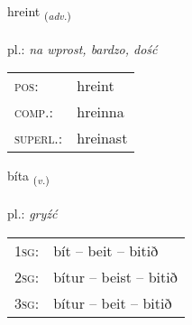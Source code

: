 \documentclass[frontgrid, backgrid]{flacards}\usepackage[]{graphicx}\usepackage[]{xcolor}
\begin{document}
\renewcommand{\flhead}{\vskip5pt \fboxsep=0pt {\small\bfseries\footnotesize Atviksorð | przysłówek}}
\renewcommand{\fcfoot}{\vskip5pt \fboxsep=0pt \hspace{2pt}{\small\bfseries\footnotesize 3K}}

\renewcommand{\blhead}{\vskip5pt {\small\bfseries\footnotesize Atviksorð | przysłówek }}
\renewcommand{\bcfoot}{\vskip5pt \hspace{2pt}{\small\bfseries\footnotesize 3K}}


{hreint \small{\textsubscript{(\textit{adv.})}} \\[1ex] %
\textphonetic{[r̥ein̥t]} \\
pl.: \emph{na wprost, bardzo, dość} \\  [2ex]
\renewcommand*{\arraystretch}{0.8}
\begin{tabular}{ll}
\textsc{pos}: & hreint \\ 
\textsc{comp.}: & hreinna \\ 
\textsc{superl.}: & hreinast \\
\end{tabular}
}

\renewcommand{\flhead}{\vskip5pt \fboxsep=0pt {\small\bfseries\footnotesize Sagnorð | czasownik}}
\renewcommand{\fcfoot}{\vskip5pt \fboxsep=0pt \hspace{2pt}{\small\bfseries\footnotesize 3K}}

\renewcommand{\blhead}{\vskip5pt {\small\bfseries\footnotesize Sagnorð | czasownik }}
\renewcommand{\bcfoot}{\vskip5pt \hspace{2pt}{\small\bfseries\footnotesize 3K}}


{bíta \small{\textsubscript{(\textit{v.})}} \\[1ex] %
\textphonetic{[piːta]} \\
pl.: \emph{gryźć} \\  [2ex]
\renewcommand*{\arraystretch}{0.8}
\begin{tabular}{p{1cm}l}
\textsc{1sg}: & bít -- beit -- bitið \\ 
\textsc{2sg}: & bítur -- beist -- bitið \\ 
\textsc{3sg}: & bítur -- beit -- bitið \\ 
\end{tabular}
}
\end{document}
